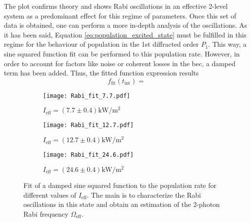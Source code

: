 The plot confirms theory and shows Rabi oscillations in an effective 2-level system as a predominant effect for this regime of parameters. Once this set of data is obtained, one can perform a more in-depth analysis of the oscillations. As it has been said, Equation \ref{eq:population_excited_state} must be fulfilled in this regime for the behaviour of population in the 1st diffracted order $P_1$. This way, a sine squared function fit can be performed to this population rate. However, in order to account for factors like noise or coherent losses in the \ac{bec}, a damped term has been added. Thus, the fitted function expression results
\begin{equation}
	f_\text{fit}(t_\text{int}) = 
\end{equation}


\begin{figure}[!htbp]
	\centering
	\begin{subfigure}{1.\textwidth}
		\centering
		\label{fig:fig:Bragg_fit_1st_order_7.7}
		\texttt{[image: Rabi\_fit\_7.7.pdf]}
		\caption{$I_\text{eff} = (7.7\pm 0.4)\si{\kilo\watt\per\meter\squared}$}
	\end{subfigure}%
	\hfill
	\begin{subfigure}{1.\textwidth}
		\centering
		\label{fig:Bragg_fit_1st_order_12.7}
		\texttt{[image: Rabi\_fit\_12.7.pdf]}
		\caption{$I_\text{eff} = (12.7\pm 0.4)\si{\kilo\watt\per\meter\squared}$}
	\end{subfigure}
	\hfill
	\begin{subfigure}{1.\textwidth}
		\centering
		\label{fig:Bragg_fit_1st_order_24.6}
		\texttt{[image: Rabi\_fit\_24.6.pdf]}
		\caption{$I_\text{eff} = (24.6\pm 0.4)\si{\kilo\watt\per\meter\squared}$}
	\end{subfigure}
	\caption[Fit of a damped sine squared function to the population rate for different values of $I_\text{eff}$]{Fit of a damped sine squared function to the population rate for different values of $I_\text{eff}$. The main is to characterize the Rabi oscillations in this state and obtain an estimation of the 2-photon Rabi frequency $\Omega_\text{eff}$.}
	\label{fig:Bragg_fit_1st_order}
\end{figure}


